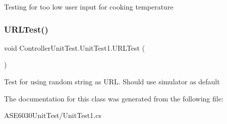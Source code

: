Testing for too low user input for cooking temperature 

\mbox{\label{class_controller_unit_test_1_1_unit_test1_abc3e4821a5f8e5b0555298e835fec144}} 
\subsubsection{\texorpdfstring{U\+R\+L\+Test()}{URLTest()}}
{\footnotesize\ttfamily void Controller\+Unit\+Test.\+Unit\+Test1.\+U\+R\+L\+Test (\begin{DoxyParamCaption}{ }\end{DoxyParamCaption})\hspace{0.3cm}{\ttfamily [inline]}}



Test for using random string as U\+RL. Should use simulator as default 



The documentation for this class was generated from the following file\+:\begin{DoxyCompactItemize}
\item 
A\+S\+E6030\+Unit\+Test/Unit\+Test1.\+cs\end{DoxyCompactItemize}

